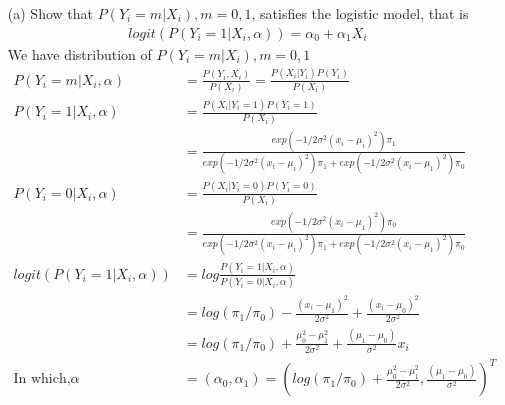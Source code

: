 \documentclass[11pt]{article} %
\begin{document}
\begin{itemize}
	\item [(a)] Show that $P(Y_i = m|X_i), m = 0, 1$, satisfies the logistic model, that is
	\begin{align*}
		logit \left(P(Y_i = 1|X_i,\alpha) \right) = \alpha_0 + \alpha_1 X_i
	\end{align*}
	We have distribution of $P(Y_i = m|X_i), m = 0, 1$ 
	\begin{align*}
		P(Y_i=m |X_i,\alpha) & = \frac{P(Y_i, X_i)}{P(X_i)} = \frac{P(X_i|Y_i) P(Y_i)}{P(X_i)}\\
		P(Y_i=1 |X_i,\alpha) &= \frac{P(X_i|Y_i=1) P(Y_i=1)}{P(X_i)} \\
		&= \frac{exp(-1/2\sigma^2 (x_i-\mu_i)^2) \pi_1}{exp(-1/2\sigma^2 (x_i-\mu_i)^2) \pi_1 + exp(-1/2\sigma^2 (x_i-\mu_1)^2)  \pi_0}\\
		P(Y_i=0 |X_i,\alpha) &= \frac{P(X_i|Y_i=0) P(Y_i=0)}{P(X_i)}\\
		&= \frac{exp(-1/2\sigma^2 (x_i-\mu_1)^2)  \pi_0}{exp(-1/2\sigma^2 (x_i-\mu_i)^2) \pi_1 + exp(-1/2\sigma^2 (x_i-\mu_1)^2)  \pi_0}\\
		logit \left(P(Y_i = 1|X_i,\alpha) \right) &= log \frac{ P(Y_i=1 |X_i,\alpha)}{P(Y_i=0 |X_i,\alpha)} \\
		&= log(\pi_1/\pi_0) - \frac{(x_i-\mu_1)^2}{2\sigma^2} + \frac{(x_i-\mu_0)^2}{2\sigma^2}\\
		&= log(\pi_1/\pi_0) +\frac{\mu_0^2 - \mu_1^2}{2\sigma^2} + \frac{(\mu_1-\mu_0)}{\sigma^2}x_i\\
		\text{In which,}  \alpha &= (\alpha_0, \alpha_1) = \left(log(\pi_1/\pi_0) +\frac{\mu_0^2 - \mu_1^2}{2\sigma^2},  \frac{(\mu_1-\mu_0)}{\sigma^2} \right)^T
	\end{align*}     
	

\end{itemize}
\end{document}
